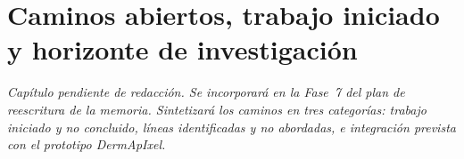 
\chapter{Caminos abiertos, trabajo iniciado y horizonte de investigación}
\label{cap:caminos}

\textit{Capítulo pendiente de redacción. Se incorporará en la Fase~7 del
plan de reescritura de la memoria. Sintetizará los caminos en tres
categorías: trabajo iniciado y no concluido, líneas identificadas y no
abordadas, e integración prevista con el prototipo DermApIxel.}

